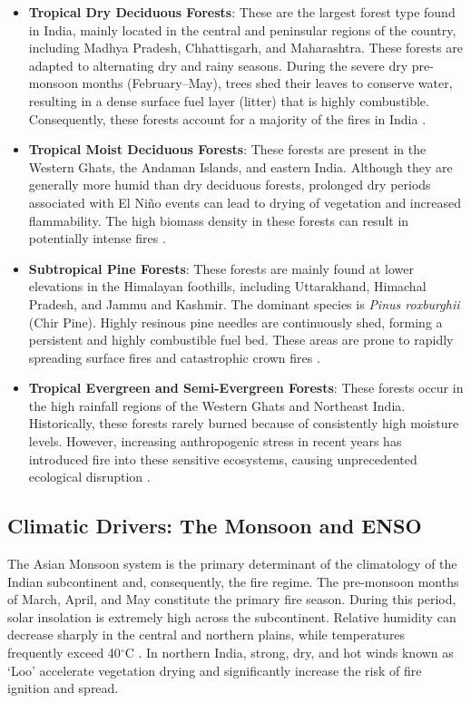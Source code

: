 \documentclass[journal, 10pt, twocolumn]{IEEEtran}
\begin{document}
\begin{itemize}
    \item \textbf{Tropical Dry Deciduous Forests}: These are the largest forest type found in India, mainly located in the central and peninsular regions of the country, including Madhya Pradesh, Chhattisgarh, and Maharashtra. These forests are adapted to alternating dry and rainy seasons. During the severe dry pre-monsoon months (February--May), trees shed their leaves to conserve water, resulting in a dense surface fuel layer (litter) that is highly combustible. Consequently, these forests account for a majority of the fires in India \cite{b13}.

    \item \textbf{Tropical Moist Deciduous Forests}: These forests are present in the Western Ghats, the Andaman Islands, and eastern India. Although they are generally more humid than dry deciduous forests, prolonged dry periods associated with El Niño events can lead to drying of vegetation and increased flammability. The high biomass density in these forests can result in potentially intense fires \cite{b14}.

    \item \textbf{Subtropical Pine Forests}: These forests are mainly found at lower elevations in the Himalayan foothills, including Uttarakhand, Himachal Pradesh, and Jammu and Kashmir. The dominant species is \textit{Pinus roxburghii} (Chir Pine). Highly resinous pine needles are continuously shed, forming a persistent and highly combustible fuel bed. These areas are prone to rapidly spreading surface fires and catastrophic crown fires \cite{b15}.

    \item \textbf{Tropical Evergreen and Semi-Evergreen Forests}: These forests occur in the high rainfall regions of the Western Ghats and Northeast India. Historically, these forests rarely burned because of consistently high moisture levels. However, increasing anthropogenic stress in recent years has introduced fire into these sensitive ecosystems, causing unprecedented ecological disruption \cite{b16}.
\end{itemize}

\subsection{Climatic Drivers: The Monsoon and ENSO}
The Asian Monsoon system is the primary determinant of the climatology of the Indian subcontinent and, consequently, the fire regime. The pre-monsoon months of March, April, and May constitute the primary fire season. During this period, solar insolation is extremely high across the subcontinent. Relative humidity can decrease sharply in the central and northern plains, while temperatures frequently exceed 40$^\circ$C \cite{b17}. In northern India, strong, dry, and hot winds known as `Loo' accelerate vegetation drying and significantly increase the risk of fire ignition and spread.
\end{document}

